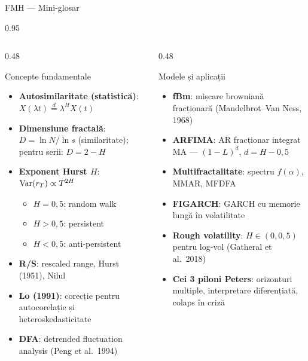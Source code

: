 \documentclass[9pt, aspectratio=169, t]{beamer}
\begin{document}
\begin{frame}[shrink=25]{FMH --- Mini-glosar}
\begin{cminipage}{0.95\textwidth}
\begin{columns}[T]
\begin{column}{0.48\textwidth}
\begin{block}{Concepte fundamentale}
\begin{itemize}\setlength{\itemsep}{0pt}
    \item \textbf{Autosimilaritate (statistică)}: $X(\lambda t) \stackrel{d}{=} \lambda^H X(t)$
    \item \textbf{Dimensiune fractală}: $D = \ln N / \ln s$ (similaritate); pentru serii: $D = 2 - H$
    \item \textbf{Exponent Hurst $H$}: $\text{Var}(r_T) \propto T^{2H}$
    \begin{itemize}\setlength{\itemsep}{0pt}
        \item $H=0{,}5$: random walk
        \item $H>0{,}5$: persistent
        \item $H<0{,}5$: anti-persistent
    \end{itemize}
    \item \textbf{R/S}: rescaled range, Hurst (1951), Nilul
    \item \textbf{Lo (1991)}: corecție pentru autocorelație și heteroskedasticitate
    \item \textbf{DFA}: detrended fluctuation analysis (Peng et al.\ 1994)
\end{itemize}
\end{block}
\end{column}
\begin{column}{0.48\textwidth}
\begin{block}{Modele și aplicații}
\begin{itemize}\setlength{\itemsep}{0pt}
    \item \textbf{fBm}: mișcare browniană fracționară (Mandelbrot--Van Ness, 1968)
    \item \textbf{ARFIMA}: AR fracționar integrat MA --- $(1-L)^d$, $d = H - 0{,}5$
    \item \textbf{Multifractalitate}: spectru $f(\alpha)$, MMAR, MFDFA
    \item \textbf{FIGARCH}: GARCH cu memorie lungă în volatilitate
    \item \textbf{Rough volatility}: $H \in (0, 0{,}5)$ pentru log-vol (Gatheral et al.\ 2018)
    \item \textbf{Cei 3 piloni Peters}: orizonturi multiple, interpretare diferențiată, colaps în criză
\end{itemize}
\end{block}
\end{column}
\end{columns}
\end{cminipage}
\end{frame}
\end{document}
